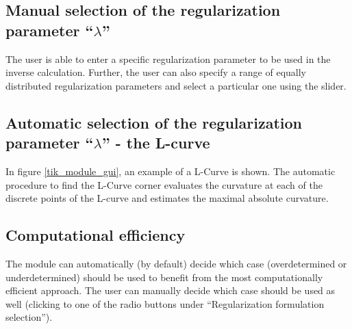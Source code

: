 \documentclass[fleqn,11pt,openany]{book}
\begin{document}
\subsection*{Manual selection of the regularization parameter ``$\lambda$''}

The user is able to enter a specific regularization parameter to be used in
the inverse calculation. Further, the user can also specify a
range of equally distributed regularization parameters and select a particular one using the slider.

\subsection*{Automatic selection of the regularization parameter ``$\lambda$'' - the L-curve}

In figure \ref{tik_module_gui}, an example of a L-Curve is shown.
The automatic procedure to find the L-Curve corner evaluates the
curvature at each of the discrete points of the L-curve and estimates the maximal absolute curvature.


\subsection*{Computational efficiency}

The module can automatically (by default) decide which case (overdetermined or
underdetermined) should be used to benefit from the most computationally efficient
approach. The user can manually decide which case should be used as
well (clicking to one of the radio buttons under ``Regularization formulation selection'').\\
\end{document}
